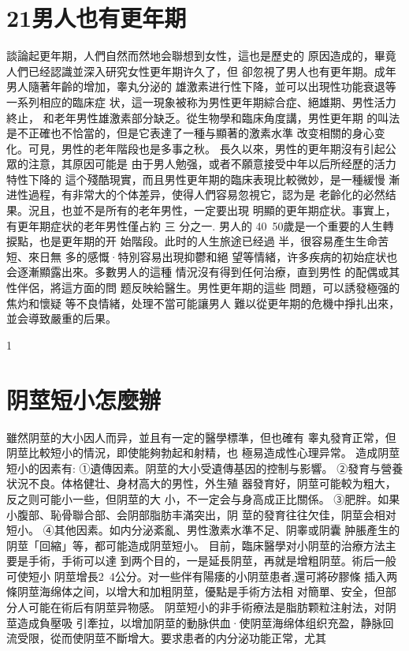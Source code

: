 \documentclass[12pt,UTF8]{ctexbook}
\begin{document}
\section{21男人也有更年期}
談論起更年期，人們自然而然地会聯想到女性，這也是歷史的
原因造成的，畢竟人們已经認識並深入研究女性更年期许久了，但
卻忽視了男人也有更年期。成年男人隨著年齡的增加，睾丸分泌的
雄激素进行性下降，並可以出現性功能衰退等一系列相应的臨床症
状，這一現象被称为男性更年期綜合症、絕雄期、男性活力終止，
和老年男性雄激素部分缺乏。從生物學和臨床角度講，男性更年期
的叫法是不正確也不恰當的，但是它表達了一種与顯著的激素水準
改变相關的身心变化。可見，男性的老年階段也是多事之秋。
長久以來，男性的更年期沒有引起公眾的注意，其原因可能是
由于男人勉强，或者不願意接受中年以后所经歷的活力特性下降的
這个殘酷現實，而且男性更年期的臨床表現比較微妙，是一種緩慢
漸进性過程，有非常大的个体差异，使得人們容易忽視它，認为是
老齡化的必然结果。況且，也並不是所有的老年男性，一定要出現
明顯的更年期症状。事實上，有更年期症状的老年男性僅占約 三
分之一.
男人的 40~50歲是一个重要的人生轉捩點，也是更年期的开
始階段。此时的人生旅途已经過
半，很容易產生生命苦短、來日無
多的感慨·特別容易出現抑鬱和絕
望等情緒，许多疾病的初始症状也
会逐漸顯露出來。多數男人的這種
情況沒有得到任何治療，直到男性
的配偶或其性伴侶，將這方面的問
题反映給醫生。男性更年期的這些
問題，可以誘發極强的焦灼和懷疑
等不良情緒，处理不當可能讓男人
難以從更年期的危機中掙扎出來，
並会導致嚴重的后果。

1
\section{阴莖短小怎麼辦}
雖然阴莖的大小因人而异，並且有一定的醫學標準，但也確有
睾丸發育正常，但阴莖比較短小的情況，即使能夠勃起和射精，也
極易造成性心理异常。
造成阴莖短小的因素有:
①遺傳因素。阴莖的大小受遺傳基因的控制与影響。
②發育与營養状況不良。体格健壮、身材高大的男性，外生殖
器發育好，阴莖可能較为粗大，反之则可能小一些，但阴莖的大
小，不一定会与身高成正比關係。
③肥胖。如果小腹部、恥骨聯合部、会阴部脂肪丰滿突出，阴
莖的發育往往欠佳，阴莖会相对短小。
④其他因素。如内分泌紊亂、男性激素水準不足、阴睾或阴囊
肿脹產生的阴莖「回縮」等，都可能造成阴莖短小。
目前，臨床醫學对小阴莖的治療方法主要是手術，手術可以達
到两个目的，一是延長阴莖，再就是增粗阴莖。術后一般可使短小
阴莖增長2~4公分。对一些伴有陽痿的小阴莖患者,還可將矽膠條
插入两條阴莖海绵体之间，以增大和加粗阴莖，優點是手術方法相
对簡單、安全，但部分人可能在術后有阴莖异物感。
阴莖短小的非手術療法是脂肪颗粒注射法，对阴莖造成負壓吸
引牽拉，以增加阴莖的動脉供血·使阴莖海绵体组织充盈，静脉回
流受限，從而使阴莖不斷增大。要求患者的内分泌功能正常，尤其
\end{document}
